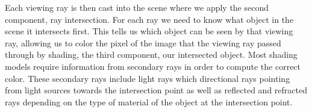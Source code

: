 Each viewing ray is then cast into the scene where we apply the second component, 
ray intersection.  For each ray we need to know what object in the scene it 
intersects first.  This tells us which object can be seen by that viewing ray,
allowing us to color the pixel of the image that the viewing ray passed through
by shading, the third component, our intersected object.  Most shading models 
require information from secondary rays in order to compute the correct color.  
These secondary rays include light rays which directional rays pointing from 
light sources towards the intersection point as well as reflected and refracted 
rays depending on the type of material of the object at the intersection point.

